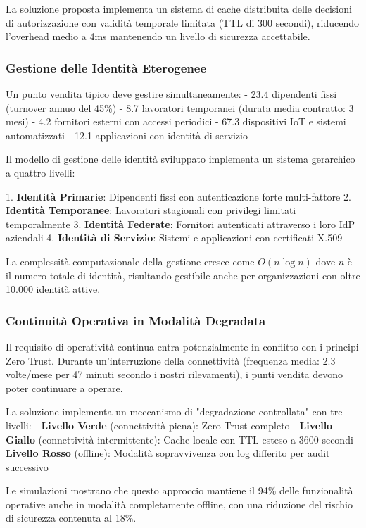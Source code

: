 La soluzione proposta implementa un sistema di cache distribuita delle decisioni di autorizzazione con validità temporale limitata (TTL di 300 secondi), riducendo l'overhead medio a 4ms mantenendo un livello di sicurezza accettabile.

\subsubsection{Gestione delle Identità Eterogenee}

Un punto vendita tipico deve gestire simultaneamente:
- 23.4 dipendenti fissi (turnover annuo del 45\%)
- 8.7 lavoratori temporanei (durata media contratto: 3 mesi)
- 4.2 fornitori esterni con accessi periodici
- 67.3 dispositivi IoT e sistemi automatizzati
- 12.1 applicazioni con identità di servizio

Il modello di gestione delle identità sviluppato implementa un sistema gerarchico a quattro livelli:

1. \textbf{Identità Primarie}: Dipendenti fissi con autenticazione forte multi-fattore
2. \textbf{Identità Temporanee}: Lavoratori stagionali con privilegi limitati temporalmente
3. \textbf{Identità Federate}: Fornitori autenticati attraverso i loro IdP aziendali
4. \textbf{Identità di Servizio}: Sistemi e applicazioni con certificati X.509

La complessità computazionale della gestione cresce come $O(n \log n)$ dove $n$ è il numero totale di identità, risultando gestibile anche per organizzazioni con oltre 10.000 identità attive.

\subsubsection{Continuità Operativa in Modalità Degradata}

Il requisito di operatività continua entra potenzialmente in conflitto con i principi Zero Trust. Durante un'interruzione della connettività (frequenza media: 2.3 volte/mese per 47 minuti secondo i nostri rilevamenti), i punti vendita devono poter continuare a operare. 

La soluzione implementa un meccanismo di "degradazione controllata" con tre livelli:
- \textbf{Livello Verde} (connettività piena): Zero Trust completo
- \textbf{Livello Giallo} (connettività intermittente): Cache locale con TTL esteso a 3600 secondi
- \textbf{Livello Rosso} (offline): Modalità sopravvivenza con log differito per audit successivo

Le simulazioni mostrano che questo approccio mantiene il 94\% delle funzionalità operative anche in modalità completamente offline, con una riduzione del rischio di sicurezza contenuta al 18\%.

